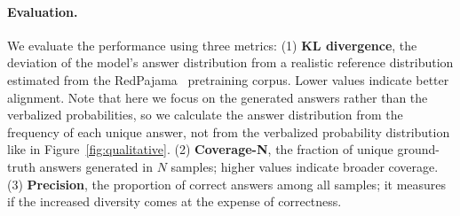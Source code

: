 \paragraph{Evaluation.}
We evaluate the performance using three metrics: 
(1) \textbf{KL divergence}, the deviation of the model's 
answer distribution from a realistic reference distribution estimated from the RedPajama~\citep{together2023redpajama} pretraining corpus.  Lower values indicate better alignment. Note that here we focus on the generated answers rather than the verbalized probabilities, so we calculate the answer distribution from the frequency of each unique answer, not from the verbalized probability distribution like in Figure~\ref{fig:qualitative}. 
(2) \textbf{Coverage-N}, the fraction of unique ground-truth answers generated in $N$ samples; higher values indicate broader coverage. 
(3) \textbf{Precision}, the proportion of correct answers among all samples; it measures if the increased diversity comes at the expense of correctness. 



